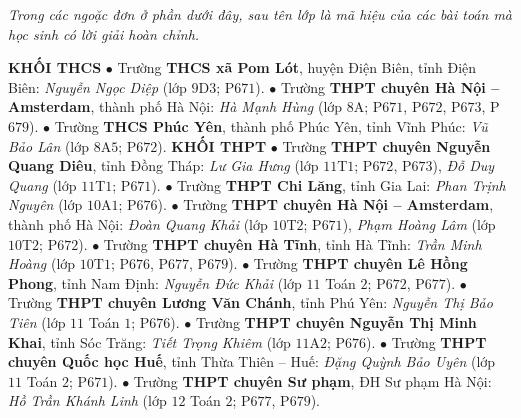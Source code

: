\textit{Trong các ngoặc đơn ở phần dưới đây, sau tên lớp là mã hiệu của các bài toán mà học sinh có lời giải hoàn chỉnh.}
\vskip 0.05cm
\begin{multicols}{2}
	\textbf{\color{thachthuctoanhoc}KHỐI THCS}
	\vskip 0.05cm
	$\bullet$  Trường \textbf{\color{thachthuctoanhoc}THCS xã Pom Lót}, huyện Điện Biên, tỉnh Điện Biên: \textit{Nguyễn Ngọc Diệp} (lớp $9$D$3$; P$671$).
	\vskip 0.05cm
	$\bullet$  Trường \textbf{\color{thachthuctoanhoc}THPT chuyên Hà Nội -- Amsterdam}, thành phố Hà Nội: \textit{Hà Mạnh Hùng} (lớp $8$A; P$671$, P$672$, P$673$, P$679$).
	\vskip 0.05cm
	$\bullet$  Trường \textbf{\color{thachthuctoanhoc}THCS Phúc Yên}, thành phố Phúc Yên, tỉnh Vĩnh Phúc: \textit{Vũ Bảo Lân} (lớp $8$A$5$; P$672$).
	\vskip 0.05cm
	\textbf{\color{thachthuctoanhoc}KHỐI THPT}
	\vskip 0.05cm
	$\bullet$  Trường \textbf{\color{thachthuctoanhoc}THPT chuyên Nguyễn Quang Diêu}, tỉnh Đồng Tháp: \textit{Lư Gia Hưng} (lớp $11$T$1$; P$672$, P$673$), \textit{Đỗ Duy Quang} (lớp $11$T$1$; P$671$).
	\vskip 0.05cm
	$\bullet$  Trường \textbf{\color{thachthuctoanhoc}THPT Chi Lăng}, tỉnh Gia Lai: \textit{Phan Trịnh Nguyên} (lớp $10$A$1$; P$676$).
	\vskip 0.05cm
	$\bullet$  Trường \textbf{\color{thachthuctoanhoc}THPT chuyên Hà Nội -- Amsterdam}, thành phố Hà Nội: \textit{Đoàn Quang Khải} (lớp $10$T$2$; P$671$), \textit{Phạm Hoàng Lâm} (lớp $10$T$2$; P$672$).
	\vskip 0.05cm
	$\bullet$  Trường \textbf{\color{thachthuctoanhoc}THPT chuyên Hà Tĩnh}, tỉnh Hà Tĩnh: \textit{Trần Minh Hoàng} (lớp $10$T$1$; P$676$, P$677$, P$679$).
	\vskip 0.05cm
	$\bullet$  Trường \textbf{\color{thachthuctoanhoc}THPT chuyên Lê Hồng Phong}, tỉnh Nam Định: \textit{Nguyễn Đức Khải} (lớp $11$ Toán $2$; P$672$, P$677$).
	\vskip 0.05cm
	$\bullet$  Trường \textbf{\color{thachthuctoanhoc}THPT chuyên Lương Văn Chánh}, tỉnh Phú Yên: \textit{Nguyễn Thị Bảo Tiên} (lớp $11$ Toán $1$; P$676$).
	\vskip 0.05cm
	$\bullet$  Trường \textbf{\color{thachthuctoanhoc}THPT chuyên Nguyễn Thị Minh Khai}, tỉnh Sóc Trăng: \textit{Tiết Trọng Khiêm} (lớp $11$A$2$; P$676$).
	\vskip 0.05cm
	$\bullet$  Trường \textbf{\color{thachthuctoanhoc}THPT chuyên Quốc học Huế}, tỉnh Thừa Thiên -- Huế: \textit{Đặng Quỳnh Bảo Uyên} (lớp $11$ Toán $2$; P$671$).
	\vskip 0.05cm
	$\bullet$  Trường \textbf{\color{thachthuctoanhoc}THPT chuyên Sư phạm}, ĐH Sư phạm Hà Nội: \textit{Hồ Trần Khánh Linh} (lớp $12$ Toán $2$; P$677$, P$679$).
\end{multicols}